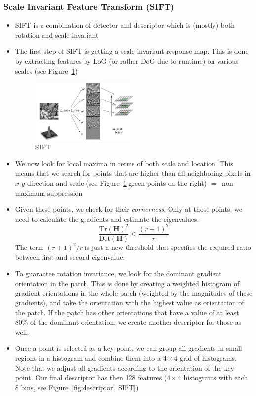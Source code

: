 \subsubsection{Scale Invariant Feature Transform (SIFT)}
\begin{itemize}
	\item SIFT is a combination of detector and descriptor which is (mostly) both rotation and scale invariant
	\item The first step of SIFT is getting a scale-invariant response map. This is done by extracting features by LoG (or rather DoG due to runtime) on various scales (see Figure~\ref{fig:SIFT_scale_invariance})
	\begin{figure}[ht!]
		\centering
		\includegraphics[width=0.5\textwidth]{figures/cv_image_processing_SIFT_scales.png}
		\caption{SIFT}
		\label{fig:SIFT_scale_invariance}
	\end{figure}
	\item We now look for local maxima in terms of both scale and location. This means that we search for points that are higher than all neighboring pixels in $x$-$y$ direction and scale (see Figure~\ref{fig:SIFT_scale_invariance} green points on the right) $\Rightarrow$ non-maximum suppression
	\item Given these points, we check for their \textit{cornerness}. Only at those points, we need to calculate the gradients and estimate the eigenvalues:
	$$\frac{\text{Tr}(\bm{H})^2}{\text{Det}(\bm{H})} < \frac{(r+1)^2}{r}$$
	The term $(r+1)^2/r$ is just a new threshold that specifies the required ratio between first and second eigenvalue.
	\item To guarantee rotation invariance, we look for the dominant gradient orientation in the patch. This is done by creating a weighted histogram of gradient orientations in the whole patch (weighted by the magnitudes of these gradients), and take the orientation with the highest value as orientation of the patch. If the patch has other orientations that have a value of at least 80\% of the dominant orientation, we create another descriptor for those as well.
	\item Once a point is selected as a key-point, we can group all gradients in small regions in a histogram and combine them into a $4\times 4$ grid of histograms. Note that we adjust all gradients according to the orientation of the key-point. Our final descriptor has then 128 features ($4\times 4$ histograms with each $8$ bins, see Figure~\ref{fig:descriptor_SIFT})

\end{itemize}
